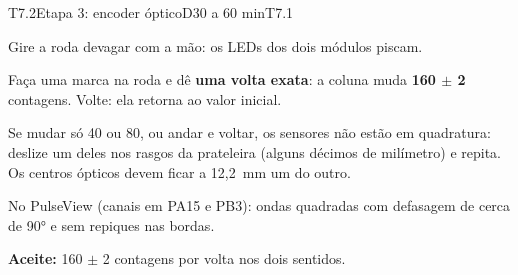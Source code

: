 \documentclass[11pt,a4paper]{article}
\newcommand{\cmd}[1]{\texttt{\detokenize{#1}}}   %
\begin{document}
\begin{tarefa}[critica]{T7.2}{Etapa 3: encoder óptico}{D}{30 a 60 min}{T7.1}
\begin{passos}
  \item Gire a roda devagar com a mão: os LEDs dos dois módulos piscam.
  \item Faça uma marca na roda e dê \textbf{uma volta exata}: a coluna \cmd{encoder} muda
    \textbf{160 $\pm$ 2} contagens. Volte: ela retorna ao valor inicial.
  \item Se mudar só 40 ou 80, ou andar e voltar, os sensores não estão em quadratura: deslize
    um deles nos rasgos da prateleira (alguns décimos de milímetro) e repita. Os centros
    ópticos devem ficar a 12,2~mm um do outro.
  \item No PulseView (canais em PA15 e PB3): ondas quadradas com defasagem de cerca de 90° e
    sem repiques nas bordas.
\end{passos}
\textbf{Aceite:} 160 $\pm$ 2 contagens por volta nos dois sentidos.
\end{tarefa}
\end{document}
